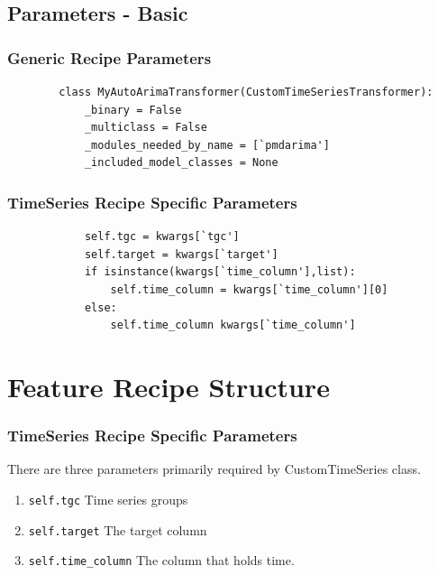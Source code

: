 \documentclass[11pt,
aspectratio=169,
hyperref={colorlinks}
]{beamer}
\begin{document}
\subsection{Parameters - Basic}
\begin{frame}[fragile]
        \frametitle{Generic Recipe Parameters}
        \begin{verbatim}
        class MyAutoArimaTransformer(CustomTimeSeriesTransformer):
            _binary = False
            _multiclass = False
            _modules_needed_by_name = [`pmdarima']
            _included_model_classes = None
        \end{verbatim}

\end{frame}
\begin{frame}[fragile]
        \frametitle{TimeSeries Recipe Specific Parameters}
        \begin{verbatim}
            self.tgc = kwargs[`tgc']  
            self.target = kwargs[`target']  
            if isinstance(kwargs[`time_column'],list):
                self.time_column = kwargs[`time_column'][0] 
            else:
                self.time_column kwargs[`time_column']
        \end{verbatim}
\end{frame}
\section{Feature Recipe Structure}
\begin{frame}[fragile]
        \frametitle{TimeSeries Recipe Specific Parameters}
        There are three parameters primarily required by CustomTimeSeries class.
        \begin{enumerate}
                \item \verb|self.tgc| Time series groups
                \item \verb|self.target| The target column
                \item \verb|self.time_column| The column that holds time. 
        \end{enumerate}

\end{frame}
\end{document}
